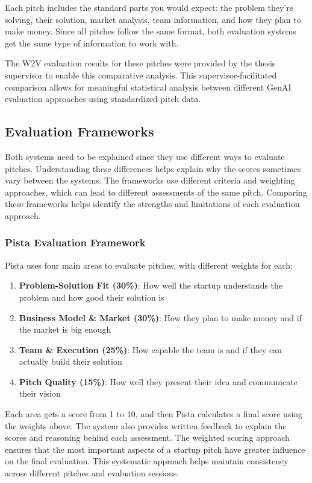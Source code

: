 Each pitch includes the standard parts you would expect: the problem they're solving, their solution, market analysis, team information, and how they plan to make money. Since all pitches follow the same format, both evaluation systems get the same type of information to work with.

The W2V evaluation results for these pitches were provided by the thesis supervisor to enable this comparative analysis. This supervisor-facilitated comparison allows for meaningful statistical analysis between different GenAI evaluation approaches using standardized pitch data.

\subsection{Evaluation Frameworks}
\label{subsec:frameworks}

Both systems need to be explained since they use different ways to evaluate pitches. Understanding these differences helps explain why the scores sometimes vary between the systems. The frameworks use different criteria and weighting approaches, which can lead to different assessments of the same pitch. Comparing these frameworks helps identify the strengths and limitations of each evaluation approach.

\subsubsection{Pista Evaluation Framework}

Pista uses four main areas to evaluate pitches, with different weights for each:

\begin{enumerate}
    \item \textbf{Problem-Solution Fit (30\%)}: How well the startup understands the problem and how good their solution is
    \item \textbf{Business Model \& Market (30\%)}: How they plan to make money and if the market is big enough
    \item \textbf{Team \& Execution (25\%)}: How capable the team is and if they can actually build their solution
    \item \textbf{Pitch Quality (15\%)}: How well they present their idea and communicate their vision
\end{enumerate}

Each area gets a score from 1 to 10, and then Pista calculates a final score using the weights above. The system also provides written feedback to explain the scores and reasoning behind each assessment. The weighted scoring approach ensures that the most important aspects of a startup pitch have greater influence on the final evaluation. This systematic approach helps maintain consistency across different pitches and evaluation sessions.

